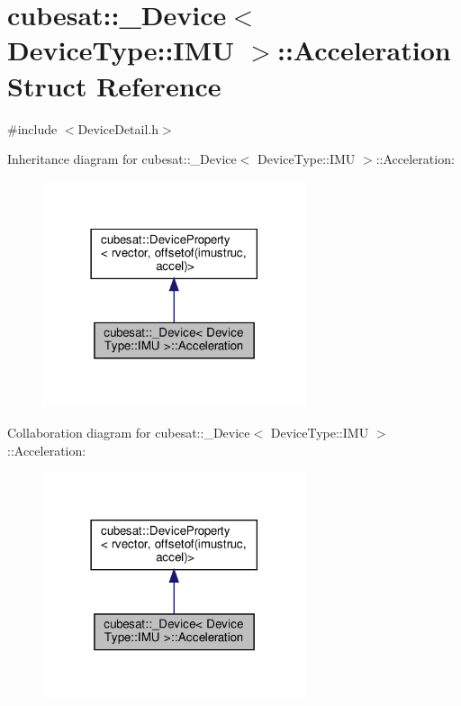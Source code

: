 \hypertarget{structcubesat_1_1__Device_3_01DeviceType_1_1IMU_01_4_1_1Acceleration}{}\section{cubesat\+:\+:\+\_\+\+Device$<$ Device\+Type\+:\+:I\+MU $>$\+:\+:Acceleration Struct Reference}
\label{structcubesat_1_1__Device_3_01DeviceType_1_1IMU_01_4_1_1Acceleration}


{\ttfamily \#include $<$Device\+Detail.\+h$>$}



Inheritance diagram for cubesat\+:\+:\+\_\+\+Device$<$ Device\+Type\+:\+:I\+MU $>$\+:\+:Acceleration\+:\nopagebreak
\begin{figure}[H]
\begin{center}
\leavevmode
\includegraphics[width=218pt]{structcubesat_1_1__Device_3_01DeviceType_1_1IMU_01_4_1_1Acceleration__inherit__graph}
\end{center}
\end{figure}


Collaboration diagram for cubesat\+:\+:\+\_\+\+Device$<$ Device\+Type\+:\+:I\+MU $>$\+:\+:Acceleration\+:\nopagebreak
\begin{figure}[H]
\begin{center}
\leavevmode
\includegraphics[width=218pt]{structcubesat_1_1__Device_3_01DeviceType_1_1IMU_01_4_1_1Acceleration__coll__graph}
\end{center}
\end{figure}
